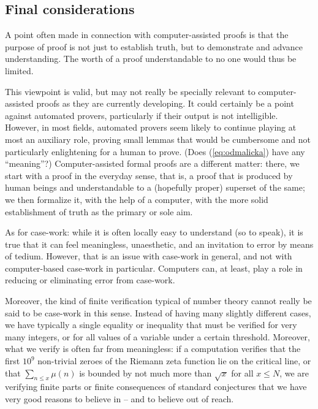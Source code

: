 \subsection{Final considerations}

A point often made in connection with computer-assisted proofs is that the
purpose of proof is not just to establish truth, but to demonstrate and
advance understanding. The worth of a proof understandable to no one
would thus be limited.

This viewpoint is valid, but may not really be specially relevant to
computer-assisted proofs as they are currently developing. It could certainly
be a point against automated provers, particularly if their output is not
intelligible. However, in most fields,
automated provers seem likely to continue playing at most an auxiliary role, 
proving small lemmas that would be cumbersome and not particularly
enlightening for a human to prove. (Does (\ref{eq:odmalicka}) have any
``meaning''?)
Computer-assisted formal proofs are a
different matter: there, we start with a proof in the everyday sense, that is,
a proof that is produced by human beings and understandable to a (hopefully
proper) superset of the same; we then formalize it, with the help of a computer,
with the more solid establishment of truth as the primary or sole aim.

As for case-work: while it is often locally easy to understand (so to
speak), it is true that it
can feel meaningless, unaesthetic, and an invitation to error by
means of tedium. However, that is an issue with case-work in general, and not
with computer-based case-work in particular. Computers can, at least, play
a role in reducing or eliminating error from case-work.

Moreover, the kind of finite verification typical of number theory
cannot really be said to be case-work in this sense. Instead of having many
slightly different cases, we have typically a single equality or inequality
that must be verified for very many integers, or for all values of a variable
under a certain threshold. Moreover, what we verify is often far from meaningless: if a computation verifies that the first $10^9$ non-trivial zeroes of the
Riemann zeta function lie on the critical line, or that $\sum_{n\leq x}
\mu(n)$ is bounded by not much more than $\sqrt{x}$ for all $x\leq N$,
we are verifying finite parts or finite consequences of standard conjectures
that we have very good reasons to believe in -- and to believe out of reach.

